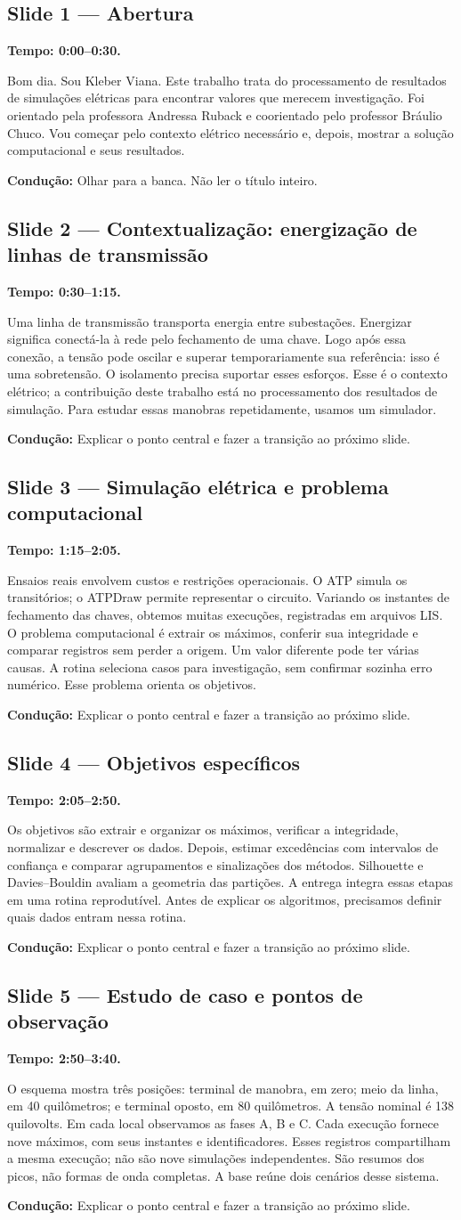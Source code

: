 \documentclass[11pt,a4paper]{article}
\newcommand{\slide}[3]{\Needspace{8\baselineskip}
  \subsection*{Slide #1 --- #2}
  \textbf{Tempo: #3.}\par}
\newcommand{\cue}[1]{\par{\small\color{accent}\textbf{Condução:} #1}\par}
\begin{document}
\slide{1}{Abertura}{0:00--0:30}
Bom dia. Sou Kleber Viana. Este trabalho trata do processamento de resultados
de simulações elétricas para encontrar valores que merecem investigação.
Foi orientado pela professora Andressa Ruback e coorientado pelo professor
Bráulio Chuco. Vou começar pelo contexto elétrico necessário e,
depois, mostrar a solução computacional e seus resultados.
\cue{Olhar para a banca. Não ler o título inteiro.}


\slide{2}{Contextualização: energização de linhas de transmissão}{0:30--1:15}
Uma linha de transmissão transporta energia entre subestações. Energizar significa conectá-la à rede pelo fechamento de uma chave. Logo após essa conexão, a tensão pode oscilar e superar temporariamente sua referência: isso é uma sobretensão. O isolamento precisa suportar esses esforços. Esse é o contexto elétrico; a contribuição deste trabalho está no processamento dos resultados de simulação. Para estudar essas manobras repetidamente, usamos um simulador.
\cue{Explicar o ponto central e fazer a transição ao próximo slide.}


\slide{3}{Simulação elétrica e problema computacional}{1:15--2:05}
Ensaios reais envolvem custos e restrições operacionais. O ATP simula os transitórios; o ATPDraw permite representar o circuito. Variando os instantes de fechamento das chaves, obtemos muitas execuções, registradas em arquivos LIS. O problema computacional é extrair os máximos, conferir sua integridade e comparar registros sem perder a origem. Um valor diferente pode ter várias causas. A rotina seleciona casos para investigação, sem confirmar sozinha erro numérico. Esse problema orienta os objetivos.
\cue{Explicar o ponto central e fazer a transição ao próximo slide.}


\slide{4}{Objetivos específicos}{2:05--2:50}
Os objetivos são extrair e organizar os máximos, verificar a integridade, normalizar e descrever os dados. Depois, estimar excedências com intervalos de confiança e comparar agrupamentos e sinalizações dos métodos. Silhouette e Davies--Bouldin avaliam a geometria das partições. A entrega integra essas etapas em uma rotina reprodutível. Antes de explicar os algoritmos, precisamos definir quais dados entram nessa rotina.
\cue{Explicar o ponto central e fazer a transição ao próximo slide.}


\slide{5}{Estudo de caso e pontos de observação}{2:50--3:40}
O esquema mostra três posições: terminal de manobra, em zero; meio da linha, em 40 quilômetros; e terminal oposto, em 80 quilômetros. A tensão nominal é 138 quilovolts. Em cada local observamos as fases A, B e C. Cada execução fornece nove máximos, com seus instantes e identificadores. Esses registros compartilham a mesma execução; não são nove simulações independentes. São resumos dos picos, não formas de onda completas. A base reúne dois cenários desse sistema.
\cue{Explicar o ponto central e fazer a transição ao próximo slide.}
\end{document}
